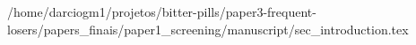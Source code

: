 /home/darciogm1/projetos/bitter-pills/paper3-frequent-losers/papers_finais/paper1_screening/manuscript/sec_introduction.tex